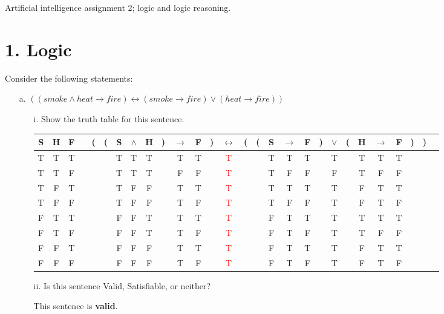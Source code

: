 \documentclass[11pt]{article}
\begin{document}
\begin{flushleft}
Artificial intelligence assignment 2; logic and logic reasoning.

\section*{1. Logic}

Consider the following statements:
    \begin{enumerate}

        \item[a.] $((smoke \land heat \rightarrow fire) \leftrightarrow (smoke \rightarrow fire) \lor (heat \rightarrow fire))$
            \begin{enumerate} 

                \item[i.] Show the truth table for this sentence. \par
                    \medskip
                    \begin{tabular}{@{ }c@{ }@{ }c@{ }@{ }c | c@{ }@{}c@{}@{}c@{}@{ }c@{ }@{ }c@{ }@{ }c@{ }@{}c@{}@{ }c@{ }@{ }c@{ }@{}c@{}@{ }c@{ }@{}c@{}@{}c@{}@{ }c@{ }@{ }c@{ }@{ }c@{ }@{}c@{}@{ }c@{ }@{}c@{}@{ }c@{ }@{ }c@{ }@{ }c@{ }@{}c@{}@{}c@{}@{ }c}
                    S & H & F &  & ( & ( & S & $\land$ & H & ) & $\rightarrow$ & F & ) & $\leftrightarrow$ & ( & ( & S & $\rightarrow$ & F & ) & $\lor$ & ( & H & $\rightarrow$ & F & ) & ) & \\
                    \hline 
                    T & T & T &  &  &  & T & T & T &  & T & T &  & \textcolor{red}{T} &  &  & T & T & T &  & T &  & T & T & T &  &  & \\
                    T & T & F &  &  &  & T & T & T &  & F & F &  & \textcolor{red}{T} &  &  & T & F & F &  & F &  & T & F & F &  &  & \\
                    T & F & T &  &  &  & T & F & F &  & T & T &  & \textcolor{red}{T} &  &  & T & T & T &  & T &  & F & T & T &  &  & \\
                    T & F & F &  &  &  & T & F & F &  & T & F &  & \textcolor{red}{T} &  &  & T & F & F &  & T &  & F & T & F &  &  & \\
                    F & T & T &  &  &  & F & F & T &  & T & T &  & \textcolor{red}{T} &  &  & F & T & T &  & T &  & T & T & T &  &  & \\
                    F & T & F &  &  &  & F & F & T &  & T & F &  & \textcolor{red}{T} &  &  & F & T & F &  & T &  & T & F & F &  &  & \\
                    F & F & T &  &  &  & F & F & F &  & T & T &  & \textcolor{red}{T} &  &  & F & T & T &  & T &  & F & T & T &  &  & \\
                    F & F & F &  &  &  & F & F & F &  & T & F &  & \textcolor{red}{T} &  &  & F & T & F &  & T &  & F & T & F &  &  & \\
                    \end{tabular}
                    \medskip
                \item[ii.] Is this sentence Valid, Satisfiable, or neither? \par
                    This sentence is \textbf{valid}.


\end{enumerate}
\end{enumerate}
\end{flushleft}
\end{document}
